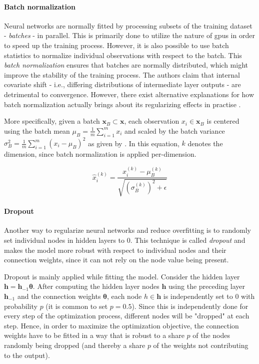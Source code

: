 \paragraph{Batch normalization}
\label{subsec:bg.nn.batchnorm}
Neural networks are normally fitted by processing subsets of the training dataset - \emph{batches} - in parallel. This is primarily done to utilize the nature of \glspl{gpu} in order to speed up the training process. However, it is also possible to use batch statistics to normalize individual observations with respect to the batch. This \emph{batch normalization} \citep{pmlr-v37-ioffe15} ensures that batches are normally distributed, which might improve the stability of the training process. The authors claim that internal covariate shift - i.e., differing distributions of intermediate layer outputs - are detrimental to convergence. However, there exist alternative explanations for how batch normalization actually brings about its regularizing effects in practise \citep{NEURIPS2018_905056c1, DBLP:conf/iclr/YangPRSS19, DBLP:conf/aistats/KohlerDLHZN19}.

More specifically, given a batch $\textbf{x}_B \subset \textbf{x}$, each observation $x_i \in \textbf{x}_B$ is centered using the batch mean $\mu_{B}={\frac {1}{m}}\sum _{i=1}^{m}x_i$ and scaled by the batch variance $\sigma _{B}^{2}={\frac {1}{m}}\sum _{i=1}^{m}(x_i-\mu_{B})^{2}$ as given by . In this equation, $k$ denotes the dimension, since batch normalization is applied per-dimension.

\begin{equation}
    \label{eq:batchnorm}
    \hat {x}_{i}^{(k)}={\frac {x_{i}^{(k)}-\mu _{B}^{(k)}}{\sqrt {\left(\sigma _{B}^{(k)}\right)^{2}+\epsilon }}}
\end{equation}

\paragraph{Dropout}
Another way to regularize neural networks and reduce overfitting is to randomly set individual nodes in hidden layers to 0. This technique is called \emph{dropout} \citep{DBLP:journals/corr/abs-1207-0580} and makes the model more robust with respect to individual nodes and their connection weights, since it can not rely on the node value being present.

Dropout is mainly applied while fitting the model. Consider the hidden layer $\textbf{h}=\textbf{h}_{-1}\boldsymbol{\theta}$. After computing the hidden layer nodes $\textbf{h}$ using the preceding layer $\textbf{h}_{-1}$  and the connection weights $\boldsymbol{\theta}$, each node $h \in \textbf{h}$ is independently set to 0 with probability $p$ (it is common to set $p=0.5$). Since this is independently done for every step of the optimization process, different nodes will be "dropped" at each step. Hence, in order to maximize the optimization objective, the connection weights have to be fitted in a way that is robust to a share $p$ of the nodes randomly being dropped (and thereby a share $p$ of the weights not contributing to the output).

